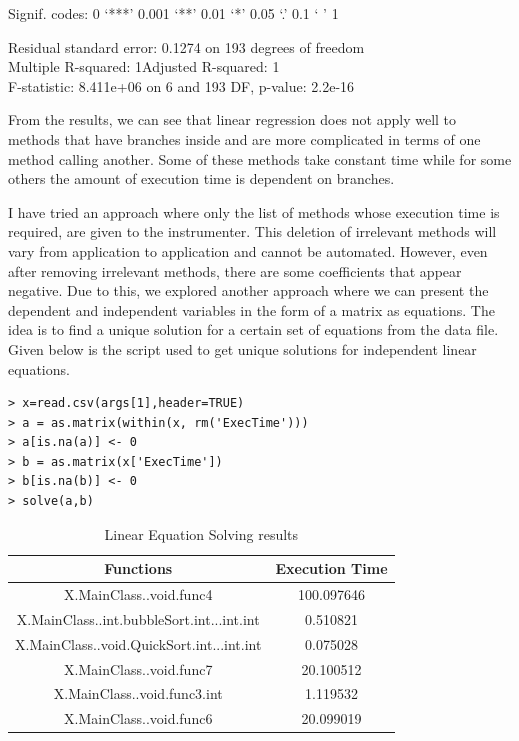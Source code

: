 \documentclass[11pt]{article}
\begin{document}
Signif. codes:  0 ‘***’ 0.001 ‘**’ 0.01 ‘*’ 0.05 ‘.’ 0.1 ‘ ’ 1

Residual standard error: 0.1274 on 193 degrees of freedom\\
Multiple R-squared:      1\hspace{2em}Adjusted R-squared:      1 \\
F-statistic: 8.411e+06 on 6 and 193 DF,  p-value: 2.2e-16

From the results, we can see that linear regression does not apply well to methods that have branches inside and are more complicated in terms of one method calling another. Some of these methods take constant time while for some others the amount of execution time is dependent on branches. 

I have tried an approach where only the list of methods whose execution time is required, are given to the instrumenter. This deletion of irrelevant methods will vary from application to application and cannot be automated. However, even after removing irrelevant methods, there are some coefficients that appear negative. Due to this, we explored another approach where we can present the dependent and independent variables in the form of a matrix as equations. The idea is to find a unique solution for a certain set of equations from the data file. Given below is the script used to get unique solutions for independent linear equations.
\newpage

\begin{lstlisting}
> x=read.csv(args[1],header=TRUE)
> a = as.matrix(within(x, rm('ExecTime')))
> a[is.na(a)] <- 0
> b = as.matrix(x['ExecTime'])
> b[is.na(b)] <- 0
> solve(a,b)
\end{lstlisting}

\begin{table}
\begin{center}
\begin{tabular}{|c|c|}
\hline         
Functions&Execution Time\\ 
\hline
X.MainClass..void.func4&100.097646\\
X.MainClass..int.bubbleSort.int...int.int&0.510821\\
X.MainClass..void.QuickSort.int...int.int&0.075028\\
X.MainClass..void.func7&20.100512\\
X.MainClass..void.func3.int&1.119532\\
X.MainClass..void.func6&20.099019\\
\hline
\end{tabular}
\caption{Linear Equation Solving results}
\end{center}
\end{table}
\end{document}
